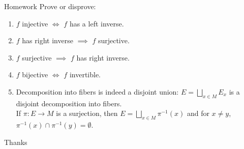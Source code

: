 \begin{frame}{Homework}
Prove or disprove:
\begin{enumerate}
    \item $f$ injective $\iff$ $f$ has a left inverse.
    \item $f$ has right inverse $\implies$ $f$ surjective.
    \item $f$ surjective $\implies$ $f$ has right inverse.
    \item $f$ bijective $\iff$ $f$ invertible.
    \item Decomposition into fibers is indeed a disjoint union: $E = \bigsqcup_{x\in M} E_x$ is a disjoint decomposition into fibers.\\
    If \(\pi: E \to M\) is a surjection, then \(E = \bigsqcup_{x\in M} \pi^{-1}(x)\) and for \(x \neq y\), \(\pi^{-1}(x) \cap \pi^{-1}(y) = \emptyset.\)
\end{enumerate}
\end{frame}

\begin{frame}{Thanks}
  \cmcendframe
\end{frame}


